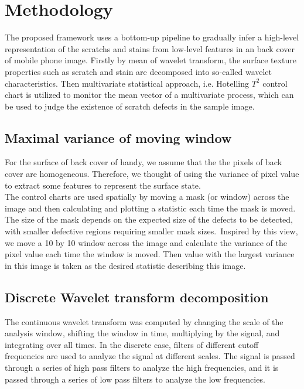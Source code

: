 \chapter{Methodology}
\label{cp:Methodology}

  The proposed framework uses a bottom-up pipeline to 
gradually infer a high-level representation of the scratchs and stains from low-level features in an back cover of mobile phone image. Firstly by mean of wavelet transform, the surface texture properties such as scratch and stain are decomposed into so-called wavelet characteristics. Then multivariate statistical approach, i.e. Hotelling $T^{2}$ control chart is utilized to monitor the mean vector of a multivariate process, which can be used to judge the existence of scratch defects in the sample image. 

\section{Maximal variance of moving window}
For the surface of back cover of handy, we assume that the the pixels of back cover are homogeneous. Therefore, we thought of using the variance of pixel value to extract some features to represent the surface state. \\

The control charts are used spatially by moving a mask (or window) across the image and then calculating and plotting a statistic each time the mask is moved. The size of the mask depends on the expected size of the defects to be detected, with smaller defective regions requiring smaller mask sizes.~\cite{megahed2011review}Inspired by this view, we move a 10 by 10 window across the image and calculate the variance of the pixel value each time the window is moved. Then value with the largest variance in this image is taken as the desired statistic describing this image.

\section{Discrete Wavelet transform decomposition}
  The continuous wavelet transform was computed by changing the scale of the analysis window, shifting the window in time, multiplying by the signal, and integrating over all times. In the discrete case, filters of different cutoff frequencies are used to analyze the signal at different scales. The signal is passed through a series of high pass filters to analyze the high frequencies, and it is passed through a series of low pass filters to analyze the low frequencies.~\cite{polikarTHE WAVELET TUTORIALusing}\\

